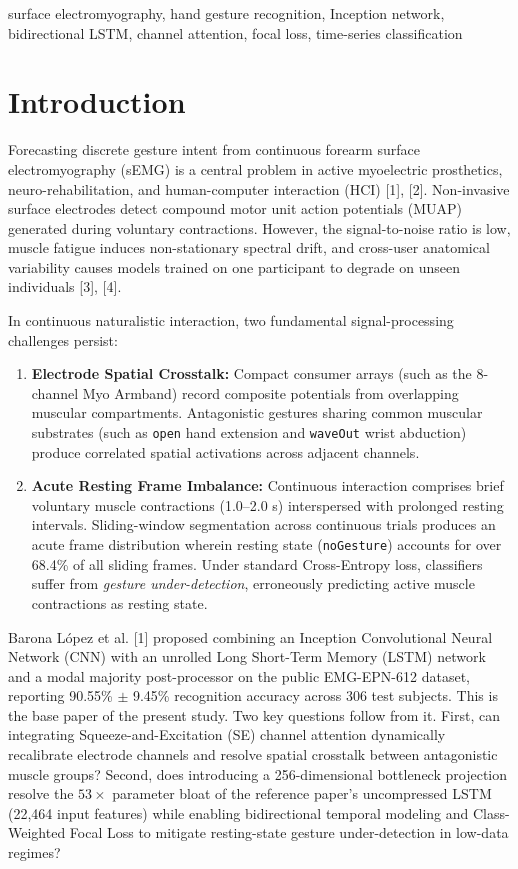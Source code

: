 \documentclass[conference]{IEEEtran}
\begin{document}
\begin{IEEEkeywords}
surface electromyography, hand gesture recognition, Inception network, bidirectional LSTM, channel attention, focal loss, time-series classification
\end{IEEEkeywords}

\section{Introduction}
Forecasting discrete gesture intent from continuous forearm surface electromyography (sEMG) is a central problem in active myoelectric prosthetics, neuro-rehabilitation, and human-computer interaction (HCI) [1], [2]. Non-invasive surface electrodes detect compound motor unit action potentials (MUAP) generated during voluntary contractions. However, the signal-to-noise ratio is low, muscle fatigue induces non-stationary spectral drift, and cross-user anatomical variability causes models trained on one participant to degrade on unseen individuals [3], [4].

In continuous naturalistic interaction, two fundamental signal-processing challenges persist:
\begin{enumerate}
    \item \textbf{Electrode Spatial Crosstalk:} Compact consumer arrays (such as the 8-channel Myo Armband) record composite potentials from overlapping muscular compartments. Antagonistic gestures sharing common muscular substrates (such as \texttt{open} hand extension and \texttt{waveOut} wrist abduction) produce correlated spatial activations across adjacent channels.
    \item \textbf{Acute Resting Frame Imbalance:} Continuous interaction comprises brief voluntary muscle contractions (1.0--2.0 s) interspersed with prolonged resting intervals. Sliding-window segmentation across continuous trials produces an acute frame distribution wherein resting state (\texttt{noGesture}) accounts for over 68.4\% of all sliding frames. Under standard Cross-Entropy loss, classifiers suffer from \textit{gesture under-detection}, erroneously predicting active muscle contractions as resting state.
\end{enumerate}

Barona L{\'o}pez et al. [1] proposed combining an Inception Convolutional Neural Network (CNN) with an unrolled Long Short-Term Memory (LSTM) network and a modal majority post-processor on the public EMG-EPN-612 dataset, reporting 90.55\% $\pm$ 9.45\% recognition accuracy across 306 test subjects. This is the base paper of the present study. Two key questions follow from it. First, can integrating Squeeze-and-Excitation (SE) channel attention dynamically recalibrate electrode channels and resolve spatial crosstalk between antagonistic muscle groups? Second, does introducing a 256-dimensional bottleneck projection resolve the $53\times$ parameter bloat of the reference paper's uncompressed LSTM (22,464 input features) while enabling bidirectional temporal modeling and Class-Weighted Focal Loss to mitigate resting-state gesture under-detection in low-data regimes?
\end{document}
